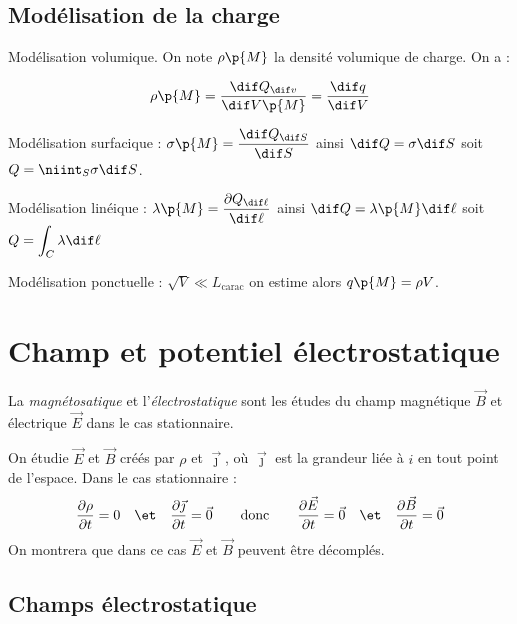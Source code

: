     \subsection{Modélisation de la charge}
    
    \begin{enumerate}
        \itt Modélisation volumique. On note $\rho\p{M}$ la densité volumique de charge. On a :
    
        \[ \rho\p{M} = \dfrac{\dif Q_{\dif v}}{\dif V\p{M}} = \dfrac{\dif q}{\dif V}\]
        
        \itt Modélisation surfacique : $\sigma\p{M} = \dfrac{\dif Q_{\dif S}}{\dif S}$ ainsi $\dif Q = \sigma \dif S$ soit $Q = \displaystyle\niint_S\sigma\dif S$.
        
        \itt Modélisation linéique : $\lambda\p{M} =\dfrac{\partial Q_{\dif \ell}}{\dif \ell}$ ainsi $\dif Q= \lambda\p{M}\dif \ell$ soit $\displaystyle Q=\int_C\lambda\dif \ell$

        \itt Modélisation ponctuelle : $\sqrt{V} \ll L_\text{carac}$ on estime alors $q\p{M} = \rho V$.
    \end{enumerate}

    \section{Champ et potentiel électrostatique}

    La \emph{magnétosatique} et l'\emph{électrostatique} sont les études du champ magnétique $\vec B$ et électrique $\vec E$ dans le cas stationnaire.
    
    On étudie $\vec E$ et $\vec B$ créés par $\rho$ et $\vec{\jmath}$, où $\vec{\jmath}$ est la grandeur liée à $i$ en tout point de l'espace. Dans le cas stationnaire :
    \[ \dfrac{\partial \rho}{\partial t} = 0 \quad\et\quad \dfrac{\partial \vec{\jmath}}{\partial t} = \vec 0 \qquad\text{donc}\qquad \dfrac{\partial \vec E}{\partial t} = \vec 0 \quad\et\quad \dfrac{\partial \vec B}{\partial t} = \vec 0   \]
    On montrera que dans ce cas $\vec E$ et $\vec B$ peuvent être décomplés.

    \subsection{Champs électrostatique}

